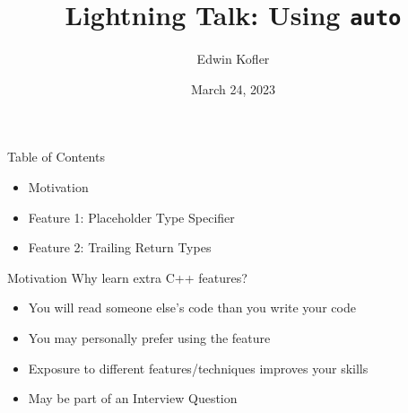 \documentclass[t]{beamer}
\title{Lightning Talk: Using \texttt{auto}}
\author{Edwin Kofler}
\institute{El Camino College Computer Science Club}
\date{March 24, 2023}
\begin{document}
\frame{\titlepage}


\begin{frame}{Table of Contents}
	\begin{itemize}
		\item Motivation
		\item Feature 1: Placeholder Type Specifier
		\item Feature 2: Trailing Return Types
	\end{itemize}

\end{frame}


\begin{frame}{Motivation}
	Why learn extra C++ features?

	\smallskip
	\begin{itemize}
		\item You will read someone else's code than you write your code
		\item You may personally prefer using the feature
		\item Exposure to different features/techniques improves your skills
		\item May be part of an Interview Question
	\end{itemize}

\end{frame}
\end{document}
